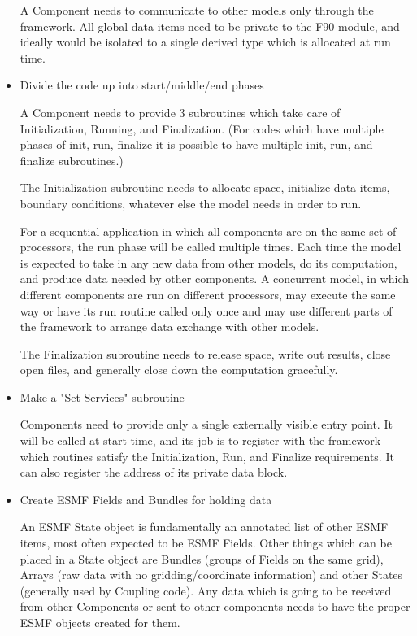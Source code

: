 \begin{itemize}
A Component needs to communicate to other models only through the
framework.  All global data items need to be private to the F90 module,
and ideally would be isolated to a single derived type which is allocated
at run time.   

\item Divide the code up into start/middle/end phases 

A Component needs to provide 3 subroutines which take care of
Initialization, Running, and Finalization.  (For codes which have
multiple phases of init, run, finalize it is possible to have
multiple init, run, and finalize subroutines.)

The Initialization subroutine needs to allocate space, initialize
data items, boundary conditions, whatever else the model needs in
order to run.

For a sequential application in which all components are on the same
set of processors, the run phase will
be called multiple times.  Each time the model is expected to take in
any new data from other models, do its computation, and produce data
needed by other components.   A concurrent model, in which different
components are run on different processors, may execute the same 
way or have its run routine called
only once and may use different parts of the framework to arrange
data exchange with other models.

The Finalization subroutine needs to release space, write out results,
close open files, and generally close down the computation gracefully.

\item Make a "Set Services" subroutine 

Components need to provide only a single externally visible entry point.
It will be called at start time, and its job is to register with the
framework which routines satisfy the Initialization, Run, and Finalize
requirements.  It can also register the address of its private data block.

\item Create ESMF Fields and Bundles for holding data

An ESMF State object is fundamentally an annotated list of other
ESMF items, most often expected to be ESMF Fields.  Other things
which can be placed in a State object are Bundles (groups of Fields
on the same grid), Arrays (raw data with no gridding/coordinate information)
and other States (generally used by Coupling code).  Any data which is
going to be received from other Components or sent to other components
needs to have the proper ESMF objects created for them.


\end{itemize}
